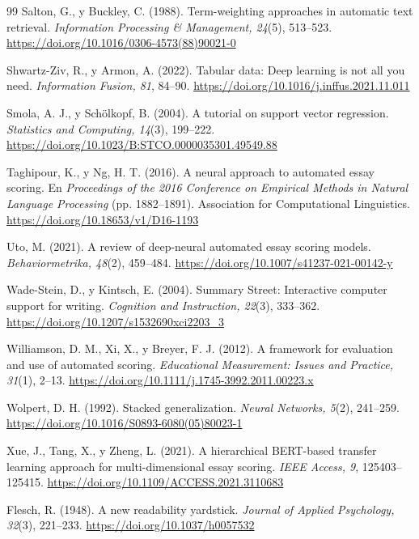 \documentclass[11pt,a4paper]{article}
\begin{document}
\begin{thebibliography}{99}
Salton, G., y Buckley, C. (1988). Term-weighting approaches in automatic text retrieval. \textit{Information Processing \& Management, 24}(5), 513--523. \url{https://doi.org/10.1016/0306-4573(88)90021-0}

Shwartz-Ziv, R., y Armon, A. (2022). Tabular data: Deep learning is not all you need. \textit{Information Fusion, 81}, 84--90. \url{https://doi.org/10.1016/j.inffus.2021.11.011}

Smola, A. J., y Sch{\"o}lkopf, B. (2004). A tutorial on support vector regression. \textit{Statistics and Computing, 14}(3), 199--222. \url{https://doi.org/10.1023/B:STCO.0000035301.49549.88}

Taghipour, K., y Ng, H. T. (2016). A neural approach to automated essay scoring. En \textit{Proceedings of the 2016 Conference on Empirical Methods in Natural Language Processing} (pp. 1882--1891). Association for Computational Linguistics. \url{https://doi.org/10.18653/v1/D16-1193}

Uto, M. (2021). A review of deep-neural automated essay scoring models. \textit{Behaviormetrika, 48}(2), 459--484. \url{https://doi.org/10.1007/s41237-021-00142-y}

Wade-Stein, D., y Kintsch, E. (2004). Summary Street: Interactive computer support for writing. \textit{Cognition and Instruction, 22}(3), 333--362. \url{https://doi.org/10.1207/s1532690xci2203_3}

Williamson, D. M., Xi, X., y Breyer, F. J. (2012). A framework for evaluation and use of automated scoring. \textit{Educational Measurement: Issues and Practice, 31}(1), 2--13. \url{https://doi.org/10.1111/j.1745-3992.2011.00223.x}

Wolpert, D. H. (1992). Stacked generalization. \textit{Neural Networks, 5}(2), 241--259. \url{https://doi.org/10.1016/S0893-6080(05)80023-1}

Xue, J., Tang, X., y Zheng, L. (2021). A hierarchical BERT-based transfer learning approach for multi-dimensional essay scoring. \textit{IEEE Access, 9}, 125403--125415. \url{https://doi.org/10.1109/ACCESS.2021.3110683}


Flesch, R. (1948). A new readability yardstick. \textit{Journal of Applied Psychology, 32}(3), 221--233. \url{https://doi.org/10.1037/h0057532}


\end{thebibliography}
\end{document}
